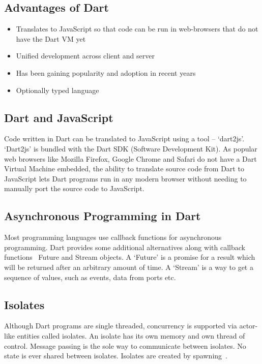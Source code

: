   \subsection{Advantages of Dart}
  \begin{itemize}
    \item Translates to JavaScript so that code can be run in web-browsers that do not have the Dart VM yet
    \item Unified development across client and server
    \item Has been gaining popularity and adoption in recent years
    \item Optionally typed language
\end{itemize}

  \subsection{Dart and JavaScript}
  Code written in Dart can be translated to JavaScript using a tool – ‘dart2js’. ‘Dart2js’ is bundled with the Dart SDK (Software Development Kit). As popular web browsers like Mozilla Firefox, Google Chrome and Safari do not have a Dart Virtual Machine embedded, the ability to translate source code from Dart to JavaScript lets Dart programs run in any modern browser without needing to manually port the source code to JavaScript.

  \subsection{Asynchronous Programming in Dart}
  Most programming languages use callback functions for asynchronous programming. Dart provides some additional alternatives along with callback functions \textendash~Future and Stream objects. A ‘Future’ is a promise for a result which will be returned after an arbitrary amount of time. A ‘Stream’ is a way to get a sequence of values, such as events, data from ports etc.

  \subsection{Isolates}
  \label{sec:isolates}
  Although Dart programs are single threaded, concurrency is supported via actor-like entities called isolates. An isolate has its own memory and own thread of control. Message passing is the sole way to communicate between isolates. No state is ever shared between isolates. Isolates are created by spawning~\cite{dartEcma}.

